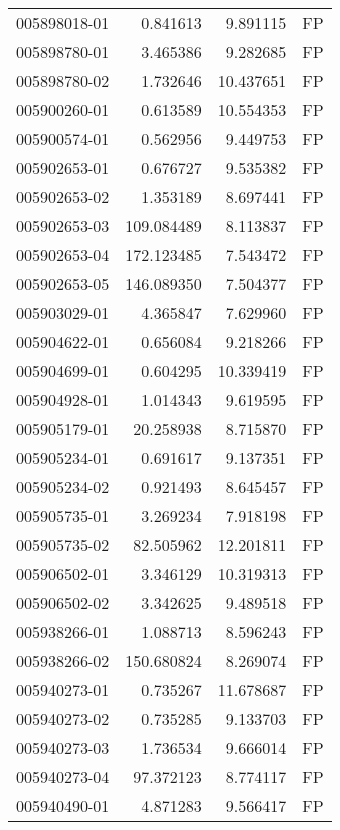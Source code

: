 \begin{tabular}{lrrl}
005898018-01 &    0.841613 &       9.891115 &   FP \\
005898780-01 &    3.465386 &       9.282685 &   FP \\
005898780-02 &    1.732646 &      10.437651 &   FP \\
005900260-01 &    0.613589 &      10.554353 &   FP \\
005900574-01 &    0.562956 &       9.449753 &   FP \\
005902653-01 &    0.676727 &       9.535382 &   FP \\
005902653-02 &    1.353189 &       8.697441 &   FP \\
005902653-03 &  109.084489 &       8.113837 &   FP \\
005902653-04 &  172.123485 &       7.543472 &   FP \\
005902653-05 &  146.089350 &       7.504377 &   FP \\
005903029-01 &    4.365847 &       7.629960 &   FP \\
005904622-01 &    0.656084 &       9.218266 &   FP \\
005904699-01 &    0.604295 &      10.339419 &   FP \\
005904928-01 &    1.014343 &       9.619595 &   FP \\
005905179-01 &   20.258938 &       8.715870 &   FP \\
005905234-01 &    0.691617 &       9.137351 &   FP \\
005905234-02 &    0.921493 &       8.645457 &   FP \\
005905735-01 &    3.269234 &       7.918198 &   FP \\
005905735-02 &   82.505962 &      12.201811 &   FP \\
005906502-01 &    3.346129 &      10.319313 &   FP \\
005906502-02 &    3.342625 &       9.489518 &   FP \\
005938266-01 &    1.088713 &       8.596243 &   FP \\
005938266-02 &  150.680824 &       8.269074 &   FP \\
005940273-01 &    0.735267 &      11.678687 &   FP \\
005940273-02 &    0.735285 &       9.133703 &   FP \\
005940273-03 &    1.736534 &       9.666014 &   FP \\
005940273-04 &   97.372123 &       8.774117 &   FP \\
005940490-01 &    4.871283 &       9.566417 &   FP \\

\end{tabular}
